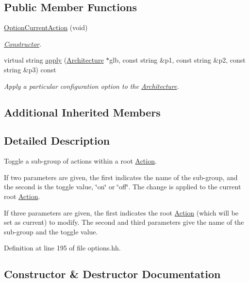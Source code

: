 \subsection*{Public Member Functions}
\begin{DoxyCompactItemize}
\item 
\mbox{\hyperlink{class_option_current_action_a9940e8e39f69f9af8e2c504f5638967b}{Option\+Current\+Action}} (void)
\begin{DoxyCompactList}\small\item\em \mbox{\hyperlink{class_constructor}{Constructor}}. \end{DoxyCompactList}\item 
virtual string \mbox{\hyperlink{class_option_current_action_abb1f2fb22f75d2c3da60a9e7ac6e6ef6}{apply}} (\mbox{\hyperlink{class_architecture}{Architecture}} $\ast$glb, const string \&p1, const string \&p2, const string \&p3) const
\begin{DoxyCompactList}\small\item\em Apply a particular configuration option to the \mbox{\hyperlink{class_architecture}{Architecture}}. \end{DoxyCompactList}\end{DoxyCompactItemize}
\subsection*{Additional Inherited Members}


\subsection{Detailed Description}
Toggle a sub-\/group of actions within a root \mbox{\hyperlink{class_action}{Action}}. 

If two parameters are given, the first indicates the name of the sub-\/group, and the second is the toggle value, \char`\"{}on\char`\"{} or \char`\"{}off\char`\"{}. The change is applied to the current root \mbox{\hyperlink{class_action}{Action}}.

If three parameters are given, the first indicates the root \mbox{\hyperlink{class_action}{Action}} (which will be set as current) to modify. The second and third parameters give the name of the sub-\/group and the toggle value. 

Definition at line 195 of file options.\+hh.



\subsection{Constructor \& Destructor Documentation}
\mbox{\label{class_option_current_action_a9940e8e39f69f9af8e2c504f5638967b}} 
